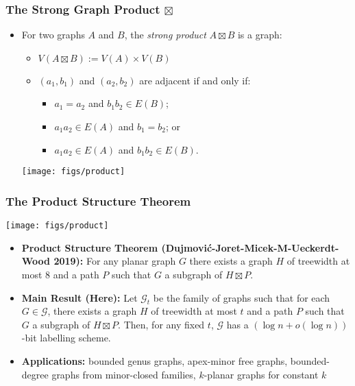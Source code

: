 \documentclass[aspectratio=169,xcolor=dvipsnames]{beamer}
\begin{document}
\begin{frame}
    \frametitle{The Strong Graph Product $\boxtimes$}

    \begin{itemize}
        \item[] For two graphs $A$ and $B$, the \emph{strong product} $A\boxtimes B$ is a graph:
        \begin{itemize}
            \item $V(A\boxtimes B):=V(A)\times V(B)$
            \item $(a_1,b_1)$ and $(a_2,b_2)$ are adjacent if and only if:
            \begin{itemize}
                \item $a_1=a_2$ and $b_1b_2\in E(B)$;
                \item $a_1a_2 \in E(A)$ and $b_1=b_2$; or
                \item  $a_1a_2 \in E(A)$ and $b_1b_2 \in E(B)$.
            \end{itemize}
        \end{itemize}
        \begin{center}
            \texttt{[image: figs/product]}
        \end{center}
    \end{itemize}
\end{frame}


\begin{frame}
    \frametitle{The Product Structure Theorem}

    \begin{center}
        \texttt{[image: figs/product]}
    \end{center}

    \begin{itemize}
        \item<+->\textbf{Product Structure Theorem (Dujmović-Joret-Micek-M-Ueckerdt-Wood 2019):} For any planar graph $G$ there exists a graph $H$ of treewidth at most $8$ and a path $P$ such that $G$ a subgraph of $H\boxtimes P$.

        \item<+->\textbf{Main Result (Here):} Let $\mathcal{G}_t$ be the family of graphs such that for each $G\in\mathcal{G}$, there exists a graph $H$ of treewidth at most $t$ and a path $P$ such that $G$ a subgraph of $H\boxtimes P$.  Then, for any fixed $t$, $\mathcal{G}$ has a $(\log n + o(\log n))$-bit labelling scheme.

        \item<+->\textbf{Applications:} bounded genus graphs, apex-minor free graphs, bounded-degree graphs from minor-closed families, $k$-planar graphs for constant $k$
    \end{itemize}
\end{frame}
\end{document}

